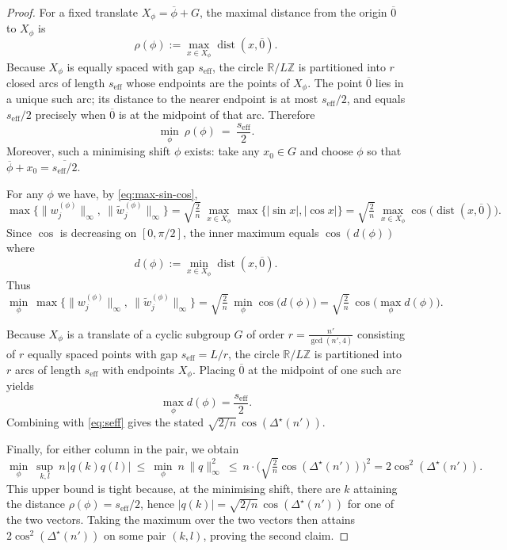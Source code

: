 \documentclass[10pt,a4paper]{amsart}
\renewcommand{\le}{\leqslant}
\begin{document}
\begin{proof}
For a fixed translate $X_\phi=\overline{\phi}+G$, the maximal distance from the origin $\overline{0}$ to $X_\phi$ is
\[
\rho(\phi):=\max_{x\in X_\phi}\operatorname{dist}(x,\overline{0}).
\]
Because $X_\phi$ is equally spaced with gap $s_{\mathrm{eff}}$, the circle $\mathbb R/L\mathbb Z$ is partitioned into $r$ closed arcs of length $s_{\mathrm{eff}}$ whose endpoints are the points of $X_\phi$. The point $\overline{0}$ lies in a unique such arc; its distance to the nearer endpoint is at most $s_{\mathrm{eff}}/2$, and equals $s_{\mathrm{eff}}/2$ precisely when $\overline{0}$ is at the midpoint of that arc. Therefore
\begin{equation}\label{eq:radius}
\min_{\phi}\ \rho(\phi)\ =\ \frac{s_{\mathrm{eff}}}{2}.
\end{equation}
Moreover, such a minimising shift $\phi$ exists: take any $x_0\in G$ and choose $\phi$ so that $\overline{\phi}+x_0=\overline{s_{\mathrm{eff}}/2}$.

\smallskip

For any $\phi$ we have, by \eqref{eq:max-sin-cos},
\[
\max\Big\{\|w^{(\phi)}_j\|_\infty,\ \|\tilde w^{(\phi)}_j\|_\infty\Big\}
=\sqrt{\tfrac{2}{n}}\ \max_{x\in X_\phi}\max\{|\sin x|,|\cos x|\}
=\sqrt{\tfrac{2}{n}}\ \max_{x\in X_\phi}\cos\big(\operatorname{dist}(x,\overline{0})\big).
\]
Since $\cos$ is decreasing on $[0,\pi/2]$, the inner maximum equals $\cos(d(\phi))$ where
\[
d(\phi):=\min_{x\in X_\phi}\operatorname{dist}(x,\overline{0}).
\]
Thus
\[
\min_{\phi}\ \max\Big\{\|w^{(\phi)}_j\|_\infty,\ \|\tilde w^{(\phi)}_j\|_\infty\Big\}
=\sqrt{\tfrac{2}{n}}\ \min_{\phi}\cos\big(d(\phi)\big)
=\sqrt{\tfrac{2}{n}}\ \cos\!\Big(\max_{\phi} d(\phi)\Big).
\]

Because $X_\phi$ is a translate of a cyclic subgroup $G$ of order $r=\frac{n'}{\gcd(n',4)}$ consisting of $r$ equally spaced points with gap $s_{\mathrm{eff}}=L/r$, the circle $\mathbb R/L\mathbb Z$ is partitioned into $r$ arcs of length $s_{\mathrm{eff}}$ with endpoints $X_\phi$. Placing $\overline{0}$ at the midpoint of one such arc yields 
\[
\max_\phi d(\phi)=\frac{s_{\mathrm{eff}}}{2}.
\]
Combining with \eqref{eq:seff} gives the stated $\sqrt{2/n}\,\cos(\Delta^\star(n'))$.

Finally, for either column in the pair, we obtain
\[
\min_{\phi}\ \sup_{k,l}\ n\,|q(k)q(l)|
\ \le\ \min_{\phi}\ n\,\|q\|_\infty^2
\ \le\ n\cdot \Big(\sqrt{\tfrac{2}{n}}\cos(\Delta^\star(n'))\Big)^2
=2\cos^2(\Delta^\star(n')).
\]
This upper bound is tight because, at the minimising shift, there are $k$ attaining the distance $\rho(\phi)=s_{\mathrm{eff}}/2$, hence $|q(k)|=\sqrt{2/n}\,\cos(\Delta^\star(n'))$ for one of the two vectors. Taking the maximum over the two vectors then attains $2\cos^2(\Delta^\star(n'))$ on some pair $(k,l)$, proving the second claim.
\end{proof}
\end{document}
